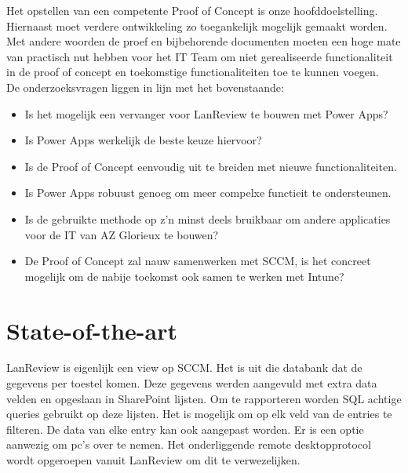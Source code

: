 \vspace{5mm}

Het opstellen van een competente Proof of Concept is onze hoofddoelstelling. Hiernaast moet verdere ontwikkeling zo toegankelijk mogelijk gemaakt worden. Met andere woorden de proef en bijbehorende documenten moeten een hoge mate van practisch nut hebben voor het IT Team om niet gerealiseerde functionaliteit in de proof of concept en toekomstige functionaliteiten toe te kunnen voegen.\\
De onderzoeksvragen liggen in lijn met het bovenstaande:
\begin{itemize}
    \item Is het mogelijk een vervanger voor LanReview te bouwen met Power Apps?
    \item Is Power Apps werkelijk de beste keuze hiervoor?
    \item Is de Proof of Concept eenvoudig uit te breiden met nieuwe functionaliteiten.
    \item Is Power Apps robuust genoeg om meer compelxe functieit te ondersteunen.
    \item Is de gebruikte methode op z'n minst deels bruikbaar om andere applicaties voor de IT van AZ Glorieux te bouwen?
    \item De Proof of Concept zal nauw samenwerken met SCCM, is het concreet mogelijk om de nabije toekomst ook samen te werken met Intune?
\end{itemize}



\section{State-of-the-art}
\label{sec:state-of-the-art}


LanReview is eigenlijk een view op SCCM. Het is uit die databank dat de gegevens per toestel komen. Deze gegevens werden aangevuld met extra data velden en opgeslaan in SharePoint lijsten. Om te rapporteren worden SQL achtige queries gebruikt op deze lijsten. Het is mogelijk om op elk veld van de entries te filteren. De data van elke entry kan ook aangepast worden. Er is een optie aanwezig om pc's over te nemen. Het onderliggende remote desktopprotocol wordt opgeroepen vanuit LanReview om dit te verwezelijken.

